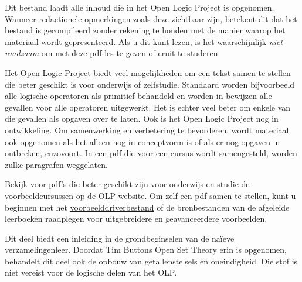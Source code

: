 \documentclass[openany]{memoir}
\begin{document}
\clearpage

\begin{editorial}
Dit bestand laadt alle inhoud die in het Open Logic Project is opgenomen.
Wanneer redactionele opmerkingen zoals deze zichtbaar zijn, betekent dit dat
het bestand is gecompileerd zonder rekening te houden met de manier waarop het
materiaal wordt gepresenteerd. Als u dit kunt lezen, is het waarschijnlijk
\emph{niet raadzaam} om met deze pdf les te geven of eruit te studeren.

Het Open Logic Project biedt veel mogelijkheden om een tekst samen te
stellen die beter geschikt is voor onderwijs of zelfstudie. Standaard worden
bijvoorbeeld alle logische operatoren als primitief behandeld en worden in
bewijzen alle gevallen voor alle operatoren uitgewerkt. Het is echter veel beter
om enkele van die gevallen als opgaven over te laten. Ook is het Open Logic
Project nog in ontwikkeling. Om samenwerking en verbetering te bevorderen,
wordt materiaal ook opgenomen als het alleen nog in conceptvorm is of als er nog
opgaven in ontbreken, enzovoort. In een pdf die voor een cursus wordt
samengesteld, worden zulke paragrafen weggelaten.

Bekijk voor pdf's die beter geschikt zijn voor onderwijs en studie de
\href{http://builds.openlogicproject.org/}{voorbeeldcursussen op de
  OLP-website}. Om zelf een pdf samen te stellen, kunt u beginnen met het
\href{https://github.com/OpenLogicProject/OpenLogic/tree/master/courses/sample}{voorbeelddriverbestand}
of de bronbestanden van de afgeleide leerboeken raadplegen
voor uitgebreidere en geavanceerdere voorbeelden.
\end{editorial}
\endgroup

\begingroup
\def\olfilename{OLP-0003}
\def\olfilepath{content/sets-functions-relations/}
\hypertarget{unit-OLP-0003}{}




\begin{editorial}
  Dit deel biedt een inleiding in de grondbeginselen van de naïeve
  verzamelingenleer. Doordat Tim Buttons Open Set Theory erin is opgenomen,
  behandelt dit deel ook de opbouw van getallenstelsels en oneindigheid. Die
  stof is niet vereist voor de logische delen van het OLP.
\end{editorial}
\endgroup
\end{document}
